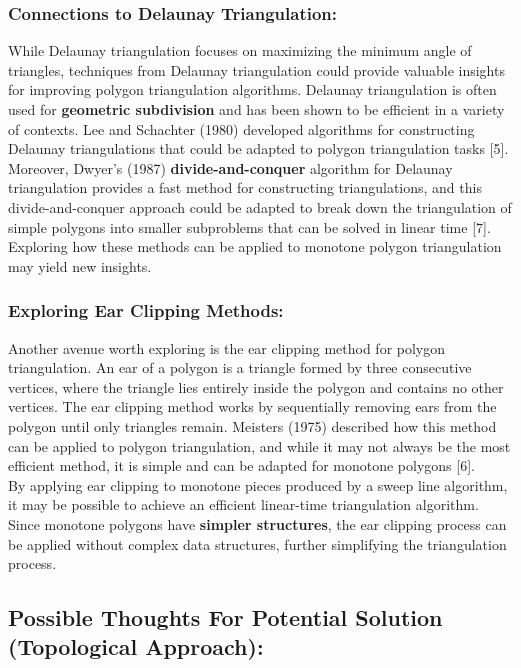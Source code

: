 \documentclass{article}
\begin{document}
\subsubsection*{Connections to Delaunay Triangulation: }
While Delaunay triangulation focuses on maximizing the minimum angle of triangles, techniques from Delaunay triangulation could provide valuable insights for improving polygon triangulation algorithms. Delaunay triangulation is often used for \textbf{geometric subdivision} and has been shown to be efficient in a variety of contexts. Lee and Schachter (1980) developed algorithms for constructing Delaunay triangulations that could be adapted to polygon triangulation tasks [5].
Moreover, Dwyer's (1987) \textbf{divide-and-conquer} algorithm for Delaunay triangulation provides a fast method for constructing triangulations, and this divide-and-conquer approach could be adapted to break down the triangulation of simple polygons into smaller subproblems that can be solved in linear time [7]. Exploring how these methods can be applied to monotone polygon triangulation may yield new insights.

\subsubsection*{Exploring Ear Clipping Methods:}
Another avenue worth exploring is the ear clipping method for polygon triangulation. An ear of a polygon is a triangle formed by three consecutive vertices, where the triangle lies entirely inside the polygon and contains no other vertices. The ear clipping method works by sequentially removing ears from the polygon until only triangles remain. Meisters (1975) described how this method can be applied to polygon triangulation, and while it may not always be the most efficient method, it is simple and can be adapted for monotone polygons [6].
\\
By applying ear clipping to monotone pieces produced by a sweep line algorithm, it may be possible to achieve an efficient linear-time triangulation algorithm. Since monotone polygons have \textbf{simpler structures}, the ear clipping process can be applied without complex data structures, further simplifying the triangulation process.

\subsection*{Possible Thoughts For Potential Solution (Topological Approach):}
\end{document}
